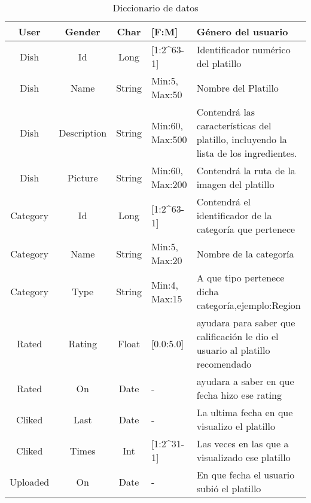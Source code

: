 \begin{landscape}
\begin{table}
\begin{center}
\begin{tabular}{| c | c | c | p{3cm} | p{12cm}|}
				\midrule
				User     & Gender      & Char   & [F:M]           & Género del usuario                                                                    \\
				\midrule
				Dish     & Id          & Long   & [1:2\^{ }63-1]  & Identificador numérico del platillo                                                   \\
				\midrule
				Dish     & Name        & String & Min:5, Max:50   & Nombre del Platillo                                                                    \\
				\midrule
				Dish     & Description & String & Min:60, Max:500 & Contendrá las características del platillo, incluyendo la lista de los ingredientes. \\
				\midrule
				Dish     & Picture     & String & Min:60, Max:200 & Contendrá la ruta de la imagen del platillo                                           \\
				\midrule
				Category & Id          & Long   & [1:2\^{ }63-1]  & Contendrá el identificador de la categoría que pertenece                             \\
				\midrule
				Category & Name        & String & Min:5, Max:20   & Nombre de la categoría                                                                \\
				\midrule
				Category & Type        & String & Min:4, Max:15   & A que tipo pertenece dicha categoría,ejemplo:Region                                   \\
				\midrule
				Rated    & Rating      & Float  & [0.0:5.0]       & ayudara para saber que calificación le dio el usuario 			al platillo recomendado      \\
				\midrule
				Rated    & On          & Date   & -               & ayudara a saber en que fecha hizo ese rating                                           \\
				\midrule
				Cliked   & Last        & Date   & -               & La ultima fecha en que visualizo el platillo                                           \\
				\midrule
				Cliked   & Times       & Int    & [1:2\^{ }31-1]  & Las veces en las que a visualizado ese platillo                                        \\
				\midrule
				Uploaded & On          & Date   & -               & En que fecha el usuario subió el platillo                                             \\
				\bottomrule
			\end{tabular}
			\caption{Diccionario de datos}
			\label{Diccionario de datos}
		\end{center}
	\end{table}
\end{landscape}  
\newpage
